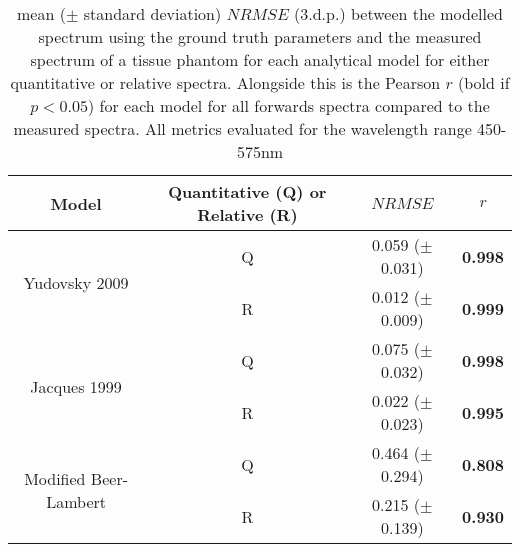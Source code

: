 \begin{table}[htbp]
    \centering
    \caption{mean ($\pm$ standard deviation) $NRMSE$ (3.d.p.) between the modelled spectrum using the ground truth parameters and the measured spectrum of a tissue phantom for each analytical model for either quantitative or relative spectra. Alongside this is the Pearson $r$ (bold if $p < 0.05$) for each model for all forwards spectra compared to the measured spectra. All metrics evaluated for the wavelength range 450-575nm}
    \begin{tabular}{|c|c|c|c|}
        \hline 
        Model & Quantitative (Q) or Relative (R) & $NRMSE$ & $r$ \\
        \hline
        \multirow{2}{*}{Yudovsky 2009} & Q & 0.059 ($\pm$ 0.031) & \textbf{0.998} \\
        & R & 0.012 ($\pm$ 0.009) & \textbf{0.999} \\
        \hline
        \multirow{2}{*}{Jacques 1999} & Q & 0.075 ($\pm$ 0.032) & \textbf{0.998} \\
        & R & 0.022 ($\pm$ 0.023) & \textbf{0.995} \\
        \hline
        \multirow{2}{*}{Modified Beer-Lambert} & Q & 0.464 ($\pm$ 0.294) & \textbf{0.808} \\
        & R & 0.215 ($\pm$ 0.139) & \textbf{0.930} \\
        \hline
    \end{tabular}
    \label{tb:NRMSEphantom}
\end{table}


